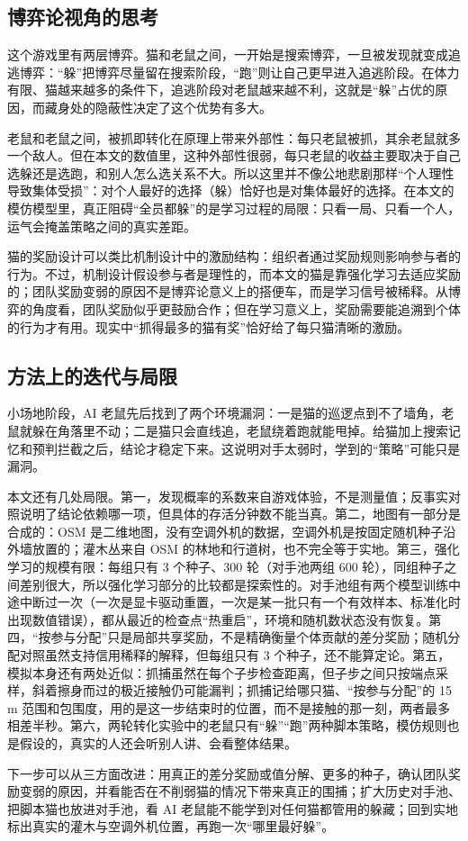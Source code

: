 \subsection{博弈论视角的思考}
这个游戏里有两层博弈。猫和老鼠之间，一开始是搜索博弈，一旦被发现就变成追逃博弈：“躲”把博弈尽量留在搜索阶段，“跑”则让自己更早进入追逃阶段。在体力有限、猫越来越多的条件下，追逃阶段对老鼠越来越不利，这就是“躲”占优的原因，而藏身处的隐蔽性决定了这个优势有多大。

老鼠和老鼠之间，被抓即转化在原理上带来外部性：每只老鼠被抓，其余老鼠就多一个敌人。但在本文的数值里，这种外部性很弱，每只老鼠的收益主要取决于自己选躲还是选跑，和别人怎么选关系不大。所以这里并不像公地悲剧那样“个人理性导致集体受损”：对个人最好的选择（躲）恰好也是对集体最好的选择。在本文的模仿模型里，真正阻碍“全员都躲”的是学习过程的局限：只看一局、只看一个人，运气会掩盖策略之间的真实差距。

猫的奖励设计可以类比机制设计中的激励结构：组织者通过奖励规则影响参与者的行为。不过，机制设计假设参与者是理性的，而本文的猫是靠强化学习去适应奖励的；团队奖励变弱的原因不是博弈论意义上的搭便车，而是学习信号被稀释。从博弈的角度看，团队奖励似乎更鼓励合作；但在学习意义上，奖励需要能追溯到个体的行为才有用。现实中“抓得最多的猫有奖”恰好给了每只猫清晰的激励。

\subsection{方法上的迭代与局限}
小场地阶段，AI 老鼠先后找到了两个环境漏洞：一是猫的巡逻点到不了墙角，老鼠就躲在角落里不动；二是猫只会直线追，老鼠绕着跑就能甩掉。给猫加上搜索记忆和预判拦截之后，结论才稳定下来。这说明对手太弱时，学到的“策略”可能只是漏洞。

本文还有几处局限。第一，发现概率的系数来自游戏体验，不是测量值；反事实对照说明了结论依赖哪一项，但具体的存活分钟数不能当真。第二，地图有一部分是合成的：OSM 是二维地图，没有空调外机的数据，空调外机是按固定随机种子沿外墙放置的；灌木丛来自 OSM 的林地和行道树，也不完全等于实地。第三，强化学习的规模有限：每组只有 3 个种子、300 轮（对手池两组 600 轮），同组种子之间差别很大，所以强化学习部分的比较都是探索性的。对手池组有两个模型训练中途中断过一次（一次是显卡驱动重置，一次是某一批只有一个有效样本、标准化时出现数值错误），都从最近的检查点“热重启”，环境和随机数状态没有恢复。第四，“按参与分配”只是局部共享奖励，不是精确衡量个体贡献的差分奖励；随机分配对照虽然支持信用稀释的解释，但每组只有 3 个种子，还不能算定论。第五，模拟本身还有两处近似：抓捕虽然在每个子步检查距离，但子步之间只按端点采样，斜着擦身而过的极近接触仍可能漏判；抓捕记给哪只猫、“按参与分配”的 15 m 范围和包围度，用的是这一步结束时的位置，而不是接触的那一刻，两者最多相差半秒。第六，两轮转化实验中的老鼠只有“躲”“跑”两种脚本策略，模仿规则也是假设的，真实的人还会听别人讲、会看整体结果。

下一步可以从三方面改进：用真正的差分奖励或值分解、更多的种子，确认团队奖励变弱的原因，并看能否在不削弱猫的情况下带来真正的围捕；扩大历史对手池、把脚本猫也放进对手池，看 AI 老鼠能不能学到对任何猫都管用的躲藏；回到实地标出真实的灌木与空调外机位置，再跑一次“哪里最好躲”。
